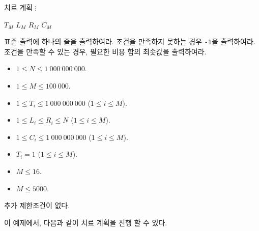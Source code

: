 \begin{problem}{치료 계획}
	$\vdots$
	
	$T_M$ $L_M$ $R_M$ $C_M$
	
	\OutputFile
	
	
	표준 출력에 하나의 줄을 출력하여라. 조건을 만족하지 못하는 경우 \texttt{-1}을 출력하여라. 조건을 만족할 수 있는 경우, 필요한 비용 합의 최솟값을 출력하여라.
	
	
	

	\Constraints


	\begin{itemize}
		
		\item $1 \le N \le 1\ 000\ 000\ 000$.
		\item $1 \le M \le 100\ 000$.
		\item $1 \le T_i \le 1\ 000\ 000\ 000$ ($1 \le i \le M$).
		\item $1 \le L_i \le R_i \le N$ ($1 \le i \le M$).
		\item $1 \le C_i \le 1\ 000\ 000\ 000$ ($1 \le i \le M$).
	\end{itemize}


	\begin{itemize}
		\item $T_i = 1$ ($1 \le i \le M$).
	\end{itemize}

	
	\begin{itemize}
		\item $M \le 16$.
	\end{itemize}


	\begin{itemize}
		\item $M \le 5000$.
	\end{itemize}
	
	
	추가 제한조건이 없다.
		
	\Examples
		
	\begin{example}
\end{example}

	이 예제에서, 다음과 같이 치료 계획을 진행 할 수 있다.


\end{problem}
